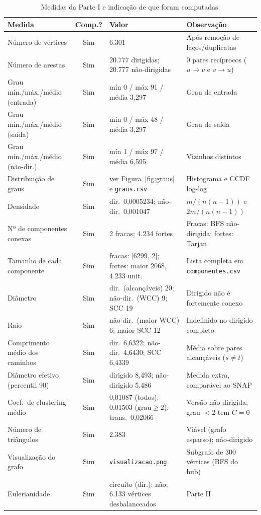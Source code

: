 \documentclass[10pt,a4paper,twocolumn]{article}
\begin{document}
\begin{table}[t]\centering\scriptsize
\caption{Medidas da Parte I e indicação de que foram computadas.}\label{tab:medidas}
\begin{tabular}{p{3.4cm}cp{5.2cm}p{5.0cm}}\toprule
\textbf{Medida} & \textbf{Comp.?} & \textbf{Valor} & \textbf{Observação} \\\midrule
Número de vértices & Sim & 6.301 & Após remoção de laços/duplicatas \\
Número de arestas & Sim & 20.777 dirigidas; 20.777 não-dirigidas & 0 pares recíprocos ($u\to v$ e $v\to u$) \\
Grau mín./máx./médio (entrada) & Sim & mín 0 / máx 91 / média 3,297 & Grau de entrada \\
Grau mín./máx./médio (saída) & Sim & mín 0 / máx 48 / média 3,297 & Grau de saída \\
Grau mín./máx./médio (não-dir.) & Sim & mín 1 / máx 97 / média 6,595 & Vizinhos distintos \\
Distribuição de graus & Sim & ver Figura~\ref{fig:graus} e \texttt{graus.csv} & Histograma e CCDF log-log \\
Densidade & Sim & dir.\ 0,0005234; não-dir.\ 0,001047 & $m/(n(n-1))$ e $2m/(n(n-1))$ \\
Nº de componentes conexas & Sim & 2 fracas; 4.234 fortes & Fracas: BFS não-dirigida; fortes: Tarjan \\
Tamanho de cada componente & Sim & fracas: [6299, 2]; fortes: maior 2068, 4.233 unit. & Lista completa em \texttt{componentes.csv} \\
Diâmetro & Sim & dir.\ (alcançáveis) 20; não-dir.\ (WCC) 9; SCC 19 & Dirigido não é fortemente conexo \\
Raio & Sim & não-dir.\ (maior WCC) 6; maior SCC 12 & Indefinido no dirigido completo \\
Comprimento médio dos caminhos & Sim & dir.\ 6,6322; não-dir.\ 4,6430; SCC 6,4339 & Média sobre pares alcançáveis ($s\neq t$) \\
Diâmetro efetivo (percentil 90) & Sim & dirigido 8,493; não-dirigido 5,486 & Medida extra, comparável ao SNAP \\
Coef.\ de clustering médio & Sim & 0,01087 (todos); 0,01503 ($\text{grau}\ge 2$); trans.\ 0,02066 & Versão não-dirigida; grau $<2$ tem $C=0$ \\
Número de triângulos & Sim & 2.383 & Viável (grafo esparso); não-dirigido \\
Visualização do grafo & Sim & \texttt{visualizacao.png} & Subgrafo de 300 vértices (BFS do hub) \\
Eulerianidade & Sim & circuito (dir.): não; 6.133 vértices desbalanceados & Parte II \\\bottomrule
\end{tabular}
\end{table}
\end{document}
